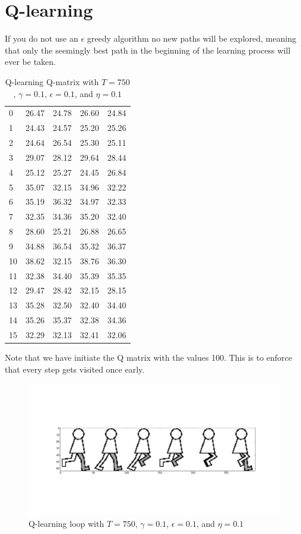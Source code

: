 \documentclass[a4paper]{article}
\begin{document}
\section{Q-learning}

If you do not use an $\epsilon$ greedy algorithm no new paths will be explored,
meaning that only the seemingly best path in the beginning of the learning
process will ever be taken.

\begin{table}[h!]
\centering
\begin{tabular}{l|l|l|l|l}
    0 & 26.47 & 24.78 & 26.60 & 24.84 \\
    1 & 24.43 & 24.57 & 25.20 & 25.26 \\
    2 & 24.64 & 26.54 & 25.30 & 25.11 \\
    3 & 29.07 & 28.12 & 29.64 & 28.44 \\
    4 & 25.12 & 25.27 & 24.45 & 26.84 \\
    5 & 35.07 & 32.15 & 34.96 & 32.22 \\
    6 & 35.19 & 36.32 & 34.97 & 32.33 \\
    7 & 32.35 & 34.36 & 35.20 & 32.40 \\
    8 & 28.60 & 25.21 & 26.88 & 26.65 \\
    9 & 34.88 & 36.54 & 35.32 & 36.37 \\
    10 & 38.62 & 32.15 & 38.76 & 36.30 \\
    11 & 32.38 & 34.40 & 35.39 & 35.35 \\
    12 & 29.47 & 28.42 & 32.15 & 28.15 \\
    13 & 35.28 & 32.50 & 32.40 & 34.40 \\
    14 & 35.26 & 35.37 & 32.38 & 34.36 \\
    15 & 32.29 & 32.13 & 32.41 & 32.06 \\
\end{tabular}
\caption{Q-learning Q-matrix with $T = 750$, $\gamma = 0.1$, $\epsilon = 0.1$, and $\eta = 0.1$}
\end{table}

Note that we have initiate the Q matrix with the values 100. This is to
enforce that every step gets visited once early.

\begin{figure}[h!]
    \centering
    \includegraphics[width=1\textwidth]{qlearning2.png}
    \caption{Q-learning loop with $T = 750$, $\gamma = 0.1$, $\epsilon = 0.1$, and $\eta = 0.1$}
\end{figure}
\end{document}
